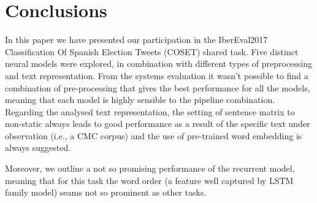 \section{Conclusions} \label{sec:conclusion}

In this paper we have presented our participation in the IberEval2017 Classification Of Spanish Election Tweets (COSET) shared task. Five distinct neural models were explored, in combination with different types of preprocessing and text representation.
From the systems evaluation it wasn't possible to find a combination of pre-processing that gives the best performance for all the models, meaning that each model is highly sensible to the pipeline combination.
Regarding the analysed text representation, the setting of sentence matrix to non-static always leads to good performance as a result of the specific text under observation (i.e., a CMC corpus) and the use of pre-trained word embedding is always suggested.
\begin{comment}
Moreover, the use of pre-trained word embedding is always suggested. %
\end{comment}
Moreover, we outline a not so promising performance of the recurrent model, meaning that for this task the word order (a feature well captured by LSTM family model) seams not so prominent as other tasks.